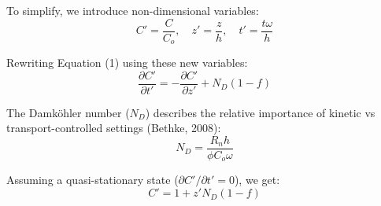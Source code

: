 \begin{tcolorbox}
{\begin{multicols}{2}

To simplify, we introduce non-dimensional variables:
\vspace{10mm}
\columnbreak %
\begin{equation}
    C' = \frac{C}{C_o},\quad z' = \frac{z}{h},\quad t' = \frac{t\omega}{h}
\end{equation}
    
\end{multicols}

\bsk

\begin{multicols}{2}%
    
    Rewriting Equation (1) using these new variables:
    \vspace{10mm}
    \columnbreak %
    \begin{equation}
        \frac{\partial C'}{\partial t'} = -\frac{\partial C'}{\partial z'} + N_D(1-f)
    \end{equation}
    
\end{multicols}

\bsk

\begin{multicols}{2} %
    
    The Damköhler number (\(N_D\)) describes the relative importance of kinetic vs transport-controlled settings (Bethke, 2008):
    \vspace{10mm}
    \columnbreak
    \begin{equation}
        N_D = \frac{R_n h}{\phi C_o \omega}
    \end{equation}
    
\end{multicols}

\bsk

\begin{multicols}{2} %
    
    Assuming a quasi-stationary state (\(\partial C'/\partial t' = 0\)), we get:
    \vspace{10mm}
    \columnbreak %
    \begin{equation}
        C' = 1 + z'N_D(1-f)
    \end{equation}
    

\end{multicols}}
\end{tcolorbox}
